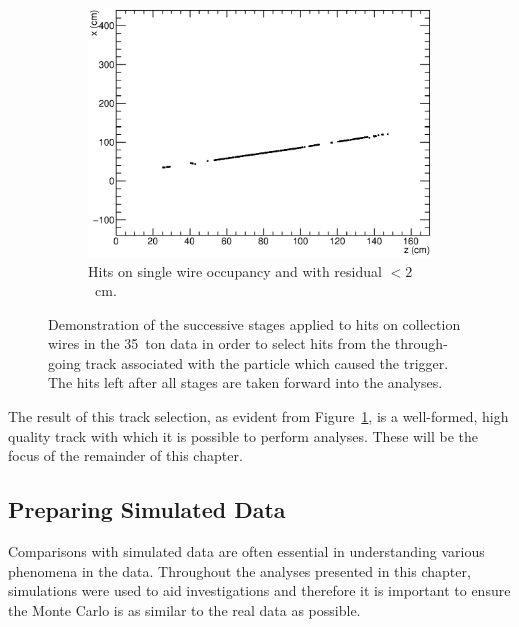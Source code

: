 \begin{figure}
\begin{subfigure}[t]{0.48\linewidth}
    \centering
    \includegraphics[width=\textwidth]{hitselection_final.eps}
    \caption{Hits on single wire occupancy and with residual $<2$~cm.}
    \label{fig:TrackSelectionFinal}
  \end{subfigure}
  \caption[Demonstration of the successive stages applied to hits on collection wires in the 35~ton data in order to select hits from the through-going track associated with the particle which caused the trigger.]{Demonstration of the successive stages applied to hits on collection wires in the 35~ton data in order to select hits from the through-going track associated with the particle which caused the trigger.  The hits left after all stages are taken forward into the analyses.}
  \label{fig:TrackSelection}
\end{figure}

The result of this track selection, as evident from Figure~\ref{fig:TrackSelectionFinal}, is a well-formed, high quality track with which it is possible to perform analyses.  These will be the focus of the remainder of this chapter.

\subsection{Preparing Simulated Data}\label{sec:SimulatedData}

Comparisons with simulated data are often essential in understanding various phenomena in the data.  Throughout the analyses presented in this chapter, simulations were used to aid investigations and therefore it is important to ensure the Monte Carlo is as similar to the real data as possible.

